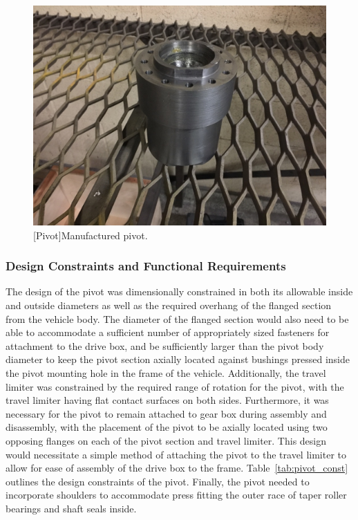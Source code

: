 \begin{figure}[htbp]
\centering
\includegraphics[height=0.3\textheight]{./images/pivot_bld}
[Pivot]{Manufactured pivot.}
\label{fig:pivot_bld}
\end{figure}
\newpage



\subsubsection{Design Constraints and Functional Requirements}

The design of the pivot was dimensionally constrained in both its allowable inside and outside diameters as well as the required overhang of the flanged section from the vehicle body. The diameter of the flanged section would also need to be able to accommodate a sufficient number of appropriately sized fasteners for attachment to the drive box, and be sufficiently larger than the pivot body diameter to keep the pivot section axially located against bushings pressed inside the pivot mounting hole in the frame of the vehicle. Additionally, the travel limiter was constrained by the required range of rotation for the pivot, with the travel limiter having flat contact surfaces on both sides. Furthermore, it was necessary for the pivot to remain attached to gear box during assembly and disassembly, with the placement of the pivot to be axially located using two opposing flanges on each of the pivot section and travel limiter. This design would necessitate a simple method of attaching the pivot to the travel limiter to allow for ease of assembly of the drive box to the frame. Table~\ref{tab:pivot_const} outlines the design constraints of the pivot. Finally, the pivot needed to incorporate shoulders to accommodate press fitting the outer race of taper roller bearings and shaft seals inside.



